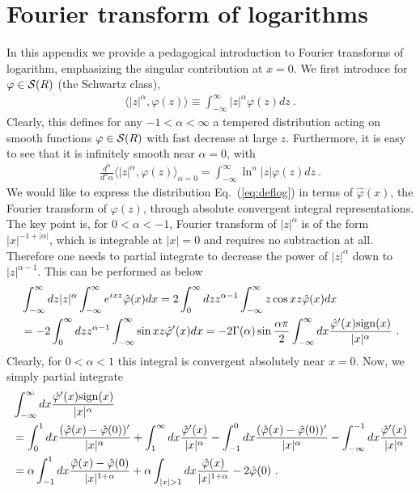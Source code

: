 \documentclass[a4paper,11pt]{article}
\begin{document}
\section{Fourier transform of logarithms}\label{sec:fourier}
In this appendix we provide a pedagogical introduction to Fourier transforms of logarithm, emphasizing the singular contribution at $x=0$. We first introduce for $\varphi \in {\cal S}(R)$ (the Schwartz class), 
\begin{align}\label{eq:deflog}
\langle |z|^{\alpha},\varphi(z)\rangle\equiv \int_{-\infty}^{\infty} |z|^{\alpha} \varphi(z)dz \ .
\end{align}
Clearly, this defines for any $-1<\alpha<\infty$ a tempered distribution acting on smooth functions  $\varphi \in {\cal S}(R)$ with fast decrease at large $z$. Furthermore, it is easy to see that it is infinitely smooth near $\alpha=0$, with
\begin{align}
\frac{d^n}{d^n\alpha}\langle |z|^{\alpha},\varphi(z)\rangle_{\alpha=0}=\int_{-\infty}^{\infty} \ln^n |z| \varphi(z)dz \ .
\end{align}
We would like to express the distribution Eq.~(\ref{eq:deflog}) in terms of $\hat \varphi(x)$, the Fourier transform of $\varphi(z)$, through absolute convergent integral representations. The key point is, for $0<\alpha<-1$, Fourier transform of $|z|^{\alpha}$ is of the form $|x|^{-1+|\alpha|}$, which is integrable at $|x|=0$ and requires no subtraction at all. Therefore one needs to partial integrate to decrease the power of $|z|^{\alpha}$ down to $|z|^{\alpha-1}$. This can be performed as below
\begin{align}
&\int_{-\infty}^{\infty} dz |z|^{\alpha}\int_{-\infty}^{\infty}e^{ixz}\hat \varphi(x) dx=2\int_{0}^{\infty} dz z^{\alpha-1}\int_{-\infty}^{\infty}z\cos xz\hat \varphi(x) dx\nonumber \\ 
&=-2\int_{0}^{\infty} dz z^{\alpha-1}\int_{-\infty}^{\infty}\sin xz\hat \varphi'(x) dx=-2\Gamma(\alpha)\sin \frac{\alpha \pi}{2}\int_{-\infty}^{\infty} dx \frac{\hat \varphi'(x) {\rm sign}(x)}{|x|^{\alpha}} \ .
\end{align}
Clearly, for $0<\alpha<1$ this integral is convergent absolutely near $x=0$. Now, we simply partial integrate 
\begin{align}
&\int_{-\infty}^{\infty} dx \frac{\hat \varphi'(x) {\rm sign}(x)}{|x|^{\alpha}} \nonumber \\ &=\int_{0}^1 dx \frac{(\hat \varphi(x)-\hat \varphi(0))'}{|x|^{\alpha}}+\int_{1}^{\infty} dx\frac{\hat \varphi'(x)}{|x|^{\alpha}}-\int_{-1}^0 dx \frac{(\hat \varphi(x)-\hat \varphi(0))'}{|x|^{\alpha}}-\int_{-\infty}^{-1} dx\frac{\hat \varphi'(x)}{|x|^{\alpha}} \nonumber \\ 
&=\alpha\int_{-1}^{1}dx\frac{\hat \varphi(x)-\hat \varphi(0)}{|x|^{1+\alpha}}+\alpha\int_{|x|>1}dx\frac{\hat \varphi(x)}{|x|^{1+\alpha}}-2\hat \varphi(0) \ .
\end{align}
\end{document}
